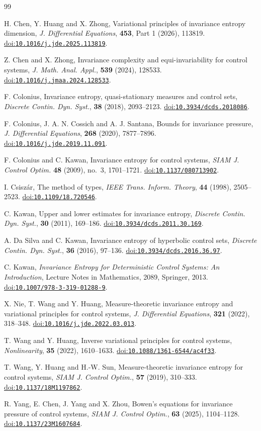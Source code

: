 \documentclass[11pt]{amsart}
\theoremstyle{definition}
\theoremstyle{remark}
\newcommand{\doi}[1]{\href{https://doi.org/#1}{doi:\nolinkurl{#1}}}
\numberwithin{equation}{section}
\begin{document}
\begin{thebibliography}{99}
\raggedright
{}H. Chen, Y. Huang and X. Zhong,
Variational principles of invariance entropy dimension,
\emph{J. Differential Equations}, \textbf{453}, Part 1 (2026), 113819.
\doi{10.1016/j.jde.2025.113819}.

Z. Chen and X. Zhong,
Invariance complexity and equi-invariability for control systems,
\emph{J. Math. Anal. Appl.}, \textbf{539} (2024), 128533.
\doi{10.1016/j.jmaa.2024.128533}.

F. Colonius,
Invariance entropy, quasi-stationary measures and control sets,
\emph{Discrete Contin. Dyn. Syst.}, \textbf{38} (2018), 2093--2123.
\doi{10.3934/dcds.2018086}.

F. Colonius, J. A. N. Cossich and A. J. Santana,
Bounds for invariance pressure,
\emph{J. Differential Equations}, \textbf{268} (2020), 7877--7896.
\doi{10.1016/j.jde.2019.11.091}.

F. Colonius and C. Kawan,
Invariance entropy for control systems, \emph{SIAM J. Control Optim.} \textbf{48} (2009), no.~3, 1701--1721.
\href{https://doi.org/10.1137/080713902}{doi:\nolinkurl{10.1137/080713902}}.

I. Csisz\'ar,
The method of types,
\emph{IEEE Trans. Inform. Theory}, \textbf{44} (1998), 2505--2523.
\doi{10.1109/18.720546}.

C. Kawan,
Upper and lower estimates for invariance entropy,
\emph{Discrete Contin. Dyn. Syst.}, \textbf{30} (2011), 169--186.
\doi{10.3934/dcds.2011.30.169}.

A. Da Silva and C. Kawan,
Invariance entropy of hyperbolic control sets,
\emph{Discrete Contin. Dyn. Syst.}, \textbf{36} (2016), 97--136.
\doi{10.3934/dcds.2016.36.97}.

C. Kawan,
\emph{Invariance Entropy for Deterministic Control Systems:
An Introduction}, Lecture Notes in Mathematics, 2089,
Springer, 2013.
\doi{10.1007/978-3-319-01288-9}.

X. Nie, T. Wang and Y. Huang,
Measure-theoretic invariance entropy and variational principles
for control systems,
\emph{J. Differential Equations}, \textbf{321} (2022), 318--348.
\doi{10.1016/j.jde.2022.03.013}.

T. Wang and Y. Huang,
Inverse variational principles for control systems,
\emph{Nonlinearity}, \textbf{35} (2022), 1610--1633.
\doi{10.1088/1361-6544/ac4f33}.

T. Wang, Y. Huang and H.-W. Sun,
Measure-theoretic invariance entropy for control systems,
\emph{SIAM J. Control Optim.}, \textbf{57} (2019), 310--333.
\doi{10.1137/18M1197862}.

R. Yang, E. Chen, J. Yang and X. Zhou,
Bowen's equations for invariance pressure of control systems,
\emph{SIAM J. Control Optim.}, \textbf{63} (2025), 1104--1128.
\doi{10.1137/23M1607684}.

\end{thebibliography}
\end{document}
